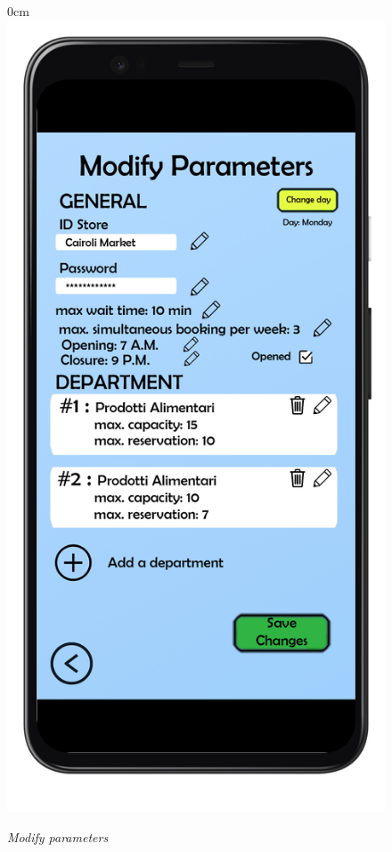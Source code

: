 \documentclass{article}
\begin{document}
		\begin{figure}[!h]
			\begin{adjustwidth} {0cm}{}
				\centering
				\includegraphics[scale=0.17]{../Mockups/ModifyParameters.png}\\
			\end{adjustwidth}
			\caption{\emph{Modify parameters}}
		\end{figure}
\end{document}
